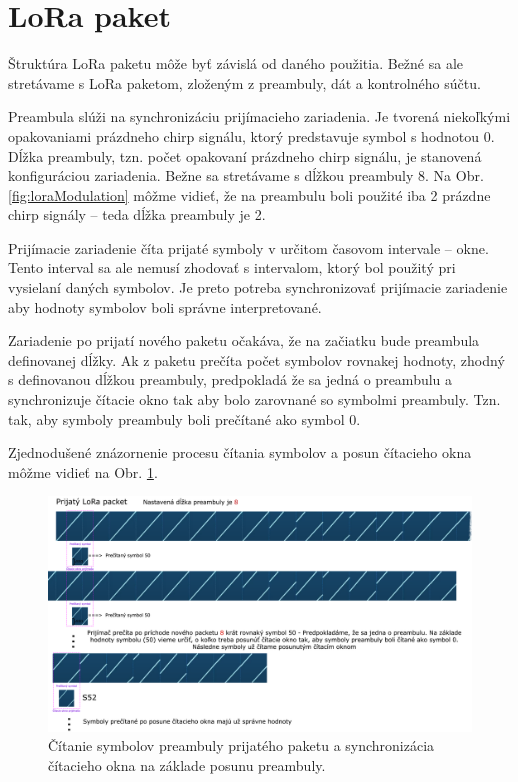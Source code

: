 \documentclass[slovak,master]{diploma}
\begin{document}
\section{LoRa paket}
Štruktúra LoRa paketu môže byť závislá od daného použitia. Bežné sa ale stretávame s LoRa paketom, zloženým z preambuly, dát a kontrolného súčtu.

Preambula slúži na synchronizáciu prijímacieho zariadenia. Je tvorená niekoľkými opakovaniami prázdneho chirp signálu, ktorý predstavuje symbol s hodnotou 0. 
Dĺžka preambuly, tzn. počet opakovaní prázdneho chirp signálu, je stanovená konfiguráciou zariadenia. Bežne sa stretávame s dĺžkou preambuly 8.
Na Obr. \ref{fig:loraModulation} môžme vidieť, že na preambulu boli použité iba 2 prázdne chirp signály -- teda dĺžka preambuly je 2.

Prijímacie zariadenie číta prijaté symboly v určitom časovom intervale -- okne. Tento interval sa ale nemusí zhodovať s intervalom, ktorý bol použitý pri vysielaní daných symbolov.
Je preto potreba synchronizovať prijímacie zariadenie aby hodnoty symbolov boli správne interpretované.

Zariadenie po prijatí nového paketu očakáva, že na začiatku bude preambula definovanej dĺžky. Ak z paketu prečíta počet symbolov rovnakej hodnoty, zhodný 
s definovanou dĺžkou preambuly, predpokladá že sa jedná o preambulu a synchronizuje čítacie okno tak aby bolo zarovnané so symbolmi preambuly. Tzn. tak, aby symboly preambuly boli 
prečítané ako symbol 0. 

Zjednodušené znázornenie procesu čítania symbolov a posun čítacieho okna môžme vidieť na Obr. \ref{fig:loraPreamble1}.

\begin{figure}[h!]
	\centering
	\includegraphics[width=1\textwidth]{Figures/preambulaSmall.png}
	\caption{Čítanie symbolov preambuly prijatého paketu a synchronizácia čítacieho okna na základe posunu preambuly.}
	\label{fig:loraPreamble1}
\end{figure}
\end{document}
